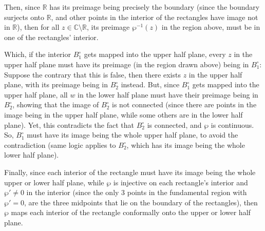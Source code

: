 \documentclass{article}
\begin{document}
\begin{itemize}
    Then, since $\mathbb{R}$ has its preimage being precisely the boundary (since the boundary surjects onto $\mathbb{R}$, and other points in the interior of the rectangles have image not in $\mathbb{R}$), then for all $z\in\mathbb{C}\setminus\mathbb{R}$, its preimage $\wp^{-1}(z)$ in the region above, must be in one of the rectangles' interior. 

    Which, if the interior $B_1^\circ$ gets mapped into the upper half plane, every $z$ in the upper half plane must have its preimage (in the region drawn above) being in $B_1^\circ$: Suppose the contrary that this is false, then there exists $z$ in the upper half plane, with its preimage being in $B_2^\circ$ instead. But, since $B_1^\circ$ gets mapped into the upper half plane, all $w$ in the lower half plane must have their preimage being in $B_2^\circ$, showing that the image of $B_2^\circ$ is not connected (since there are points in the image being in the upper half plane, while some others are in the lower half plane). Yet, this contradicts the fact that $B_2^\circ$ is connected, and $\wp$ is continuous.
    So, $B_1^\circ$ must have its image being the whole upper half plane, to avoid the contradiction (same logic applies to $B_2^\circ$, which has its image being the whole lower half plane).

    \hfil

    Finally, since each interior of the rectangle must have its image being the whole upper or lower half plane, while $\wp$ is injective on each rectangle's interior and $\wp' \neq 0$ in the interior (since the only $3$ points in the fundamental region with $\wp'=0$, are the three midpoints that lie on the boundary of the rectangles), then $\wp$ maps each interior of the rectangle conformally onto the upper or lower half plane.
\end{itemize}
\end{document}
